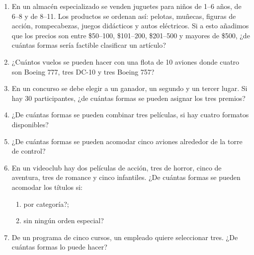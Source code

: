 \begin{Ejer}
\begin{enumerate}
\item En un almac\'en especializado se venden juguetes para ni\~nos de 1--6 a\~nos, de 6--8 y de 8--11. Los productos se ordenan as\'i: pelotas, mu\~necas, figuras de acci\'on, rompecabezas, juegos did\'acticos y autos el\'ectricos. Si a esto a\~nadimos que los precios son entre \$50--100, \$101--200, \$201--500 y mayores de \$500, ¿de cu\'antas formas ser\'ia factible clasificar un art\'iculo?

\item ¿Cu\'antos vuelos se pueden hacer con una flota de 10 aviones donde cuatro son Boeing 777, tres DC-10 y tres Boeing 757?

\item En un concurso se debe elegir a un ganador, un segundo y un tercer lugar. Si hay 30 participantes, ¿de cu\'antas formas se pueden asignar los tres premios?

\item ¿De cu\'antas formas se pueden combinar tres pel\'iculas, si hay cuatro formatos disponibles?

\item ¿De cu\'antas formas se pueden acomodar cinco aviones alrededor de la torre de control?

\item En un videoclub hay dos pel\'iculas de acci\'on, tres de horror, cinco de aventura, tres de romance y cinco infantiles. ¿De cu\'antas formas se pueden acomodar los t\'itulos si:
\begin{enumerate}
\item por categor\'ia?;
\item sin ning\'un orden especial?
\end{enumerate}

\item De un programa de cinco cursos, un empleado quiere seleccionar tres. ¿De cu\'antas formas lo puede hacer?

\end{enumerate}
\end{Ejer}

